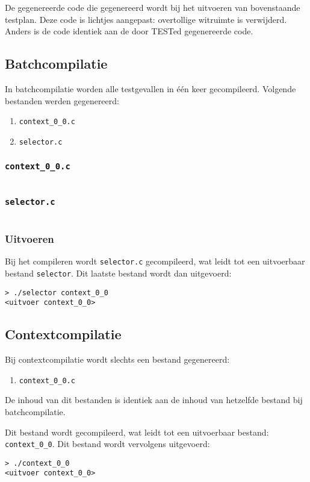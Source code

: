 De gegenereerde code die gegenereerd wordt bij het uitvoeren van bovenstaande testplan.
Deze code is lichtjes aangepast: overtollige witruimte is verwijderd.
Anders is de code identiek aan de door TESTed gegenereerde code.

\subsection{Batchcompilatie}\label{subsec:echo-function-batchcompilatie}

In batchcompilatie worden alle testgevallen in één keer gecompileerd.
Volgende bestanden werden gegenereerd:

\begin{enumerate}
    \item \texttt{context\_0\_0.c}
    \item \texttt{selector.c}
\end{enumerate}

\subsubsection{\texttt{context\_0\_0.c}}

\inputminted{c}{sources/echo-function-c/context_0_0.c}

\subsubsection{\texttt{selector.c}}

\inputminted{c}{sources/echo-function-c/selector.c}

\subsubsection{Uitvoeren}

Bij het compileren wordt \texttt{selector.c} gecompileerd, wat leidt tot een uitvoerbaar bestand \texttt{selector}.
Dit laatste bestand wordt dan uitgevoerd:

\begin{verbatim}
> ./selector context_0_0
<uitvoer context_0_0>
\end{verbatim}

\subsection{Contextcompilatie}\label{subsec:echo-function-contextcompilatie}

Bij contextcompilatie wordt slechts een bestand gegenereerd:

\begin{enumerate}
    \item \texttt{context\_0\_0.c}
\end{enumerate}

De inhoud van dit bestanden is identiek aan de inhoud van hetzelfde bestand bij batchcompilatie.

Dit bestand wordt gecompileerd, wat leidt tot een uitvoerbaar bestand: \texttt{context\_0\_0}.
Dit bestand wordt vervolgens uitgevoerd:

\begin{verbatim}
> ./context_0_0
<uitvoer context_0_0>
\end{verbatim}
